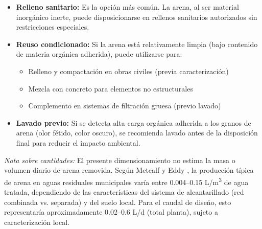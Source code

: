 \documentclass[12pt,a4paper]{article}
\begin{document}
\begin{itemize}[noitemsep,leftmargin=2em]
    \item \textbf{Relleno sanitario:} Es la opci\'on m\'as com\'un. La arena, al ser material inorg\'anico inerte, puede disposicionarse en rellenos sanitarios autorizados sin restricciones especiales.
    \item \textbf{Reuso condicionado:} Si la arena est\'a relativamente limpia (bajo contenido de materia org\'anica adherida), puede utilizarse para:
    \begin{itemize}[noitemsep,leftmargin=1.5em]
        \item Relleno y compactaci\'on en obras civiles (previa caracterizaci\'on)
        \item Mezcla con concreto para elementos no estructurales
        \item Complemento en sistemas de filtraci\'on gruesa (previo lavado)
    \end{itemize}
    \item \textbf{Lavado previo:} Si se detecta alta carga org\'anica adherida a los granos de arena (olor f\'etido, color oscuro), se recomienda lavado antes de la disposici\'on final para reducir el impacto ambiental.
\end{itemize}

\textit{Nota sobre cantidades:} El presente dimensionamiento no estima la masa o volumen diario de arena removida. Seg\'un Metcalf y Eddy \cite{metcalf2014}, la producci\'on t\'ipica de arena en aguas residuales municipales var\'ia entre 0.004--0.15 L/m\textsuperscript{3} de agua tratada, dependiendo de las caracter\'isticas del sistema de alcantarillado (red combinada vs. separada) y del suelo local. Para el caudal de dise\'no, esto representar\'ia aproximadamente 0.02--0.6 L/d (total planta), sujeto a caracterizaci\'on local.
\end{document}
